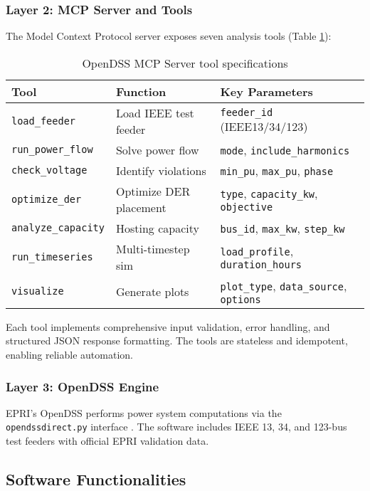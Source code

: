 \documentclass[review]{elsarticle}
\begin{document}
\subsubsection{Layer 2: MCP Server and Tools}
The Model Context Protocol \cite{anthropic2024mcp} server exposes seven analysis tools (Table \ref{tab:tools}):

\begin{table}[ht]
\centering
\caption{OpenDSS MCP Server tool specifications}
\label{tab:tools}
\begin{tabular}{@{}llp{6cm}@{}}
\toprule
\textbf{Tool} & \textbf{Function} & \textbf{Key Parameters} \\
\midrule
\texttt{load\_feeder} & Load IEEE test feeder & \texttt{feeder\_id} (IEEE13/34/123) \\
\texttt{run\_power\_flow} & Solve power flow & \texttt{mode}, \texttt{include\_harmonics} \\
\texttt{check\_voltage} & Identify violations & \texttt{min\_pu}, \texttt{max\_pu}, \texttt{phase} \\
\texttt{optimize\_der} & Optimize DER placement & \texttt{type}, \texttt{capacity\_kw}, \texttt{objective} \\
\texttt{analyze\_capacity} & Hosting capacity & \texttt{bus\_id}, \texttt{max\_kw}, \texttt{step\_kw} \\
\texttt{run\_timeseries} & Multi-timestep sim & \texttt{load\_profile}, \texttt{duration\_hours} \\
\texttt{visualize} & Generate plots & \texttt{plot\_type}, \texttt{data\_source}, \texttt{options} \\
\bottomrule
\end{tabular}
\end{table}

Each tool implements comprehensive input validation, error handling, and structured JSON response formatting. The tools are stateless and idempotent, enabling reliable automation.

\subsubsection{Layer 3: OpenDSS Engine}
EPRI's OpenDSS \cite{dugan2012opendss} performs power system computations via the \texttt{opendssdirect.py} interface \cite{meira2020opendssdirect}. The software includes IEEE 13, 34, and 123-bus test feeders with official EPRI validation data.

\subsection{Software Functionalities}
\end{document}
